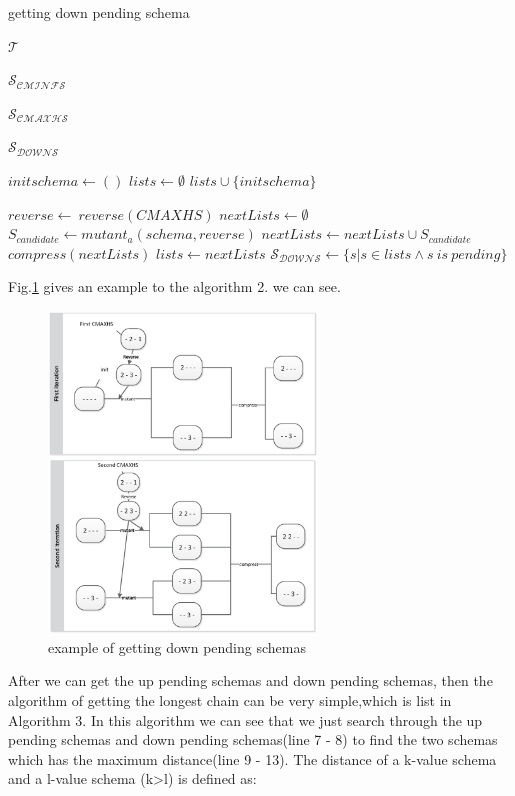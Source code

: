 \documentclass[10pt,journal,cspaper,compsoc]{IEEEtran}
\begin{document}
\begin{algorithm}
  \caption{getting down pending schema}
  \begin{algorithmic}[1]
     \Require  $\mathcal{T}$ 

     $\mathcal{S_{CMINFS}}$ 

     $\mathcal{S_{CMAXHS}}$ 

     \Ensure  $\mathcal{S_{DOWNS}}$ 

    \Statex{}
    \State $initschema \leftarrow \mathcal{()}$
    \State $lists \leftarrow \emptyset$
    \State $lists \cup \{initschema\}$

     \State $reverse \leftarrow \ reverse(CMAXHS)$
     \State $nextLists \leftarrow \emptyset$
        \State$S_{candidate} \leftarrow mutant_{a}(schema,reverse)$
        \State $nextLists \leftarrow nextLists \cup S_{candidate}$
     \EndFor
     \State $compress(nextLists)$
      \State $lists \leftarrow nextLists$
    \EndFor
     \State $\mathcal{S_{DOWNS}} \leftarrow   \{ s | s \in lists \wedge {s\ is\ pending}\}$
  \end{algorithmic}
\end{algorithm}

Fig.\ref{figct} gives an example to the algorithm 2. we can see.
\begin{figure}
 \centering
 \includegraphics[width=2.8in]{ct.eps}
 \caption{example of getting down pending schemas}
 \label{figct}
\end{figure}

After we can get the up pending schemas and down pending schemas, then the algorithm of getting the longest chain can be very simple,which is list in Algorithm 3. In this algorithm we can see that we just search through the up pending schemas and down pending schemas(line 7 - 8) to find the two schemas which has the maximum distance(line 9 - 13). The distance of a k-value schema and a l-value schema (k>l) is defined as:
\end{document}
